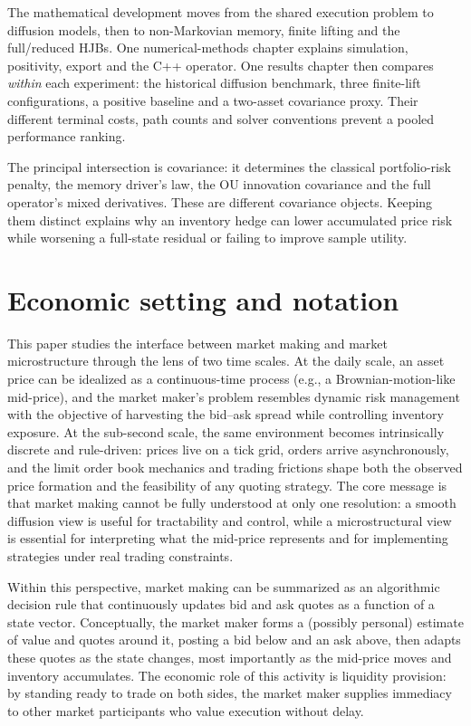 The mathematical development moves from the shared execution problem to diffusion models, then to non-Markovian memory, finite lifting and the full/reduced HJBs. One numerical-methods chapter explains simulation, positivity, export and the C++ operator. One results chapter then compares \emph{within} each experiment: the historical diffusion benchmark, three finite-lift configurations, a positive baseline and a two-asset covariance proxy. Their different terminal costs, path counts and solver conventions prevent a pooled performance ranking.

The principal intersection is covariance: it determines the classical portfolio-risk penalty, the memory driver's law, the OU innovation covariance and the full operator's mixed derivatives. These are different covariance objects. Keeping them distinct explains why an inventory hedge can lower accumulated price risk while worsening a full-state residual or failing to improve sample utility.
\section{Economic setting and notation}

This paper studies the interface between market making and market microstructure through the lens of two time scales. At the daily scale, an asset price can be idealized as a continuous-time process (e.g., a Brownian-motion-like mid-price), and the market maker's problem resembles dynamic risk management with the objective of harvesting the bid--ask spread while controlling inventory exposure. At the sub-second scale, the same environment becomes intrinsically discrete and rule-driven: prices live on a tick grid, orders arrive asynchronously, and the limit order book mechanics and trading frictions shape both the observed price formation and the feasibility of any quoting strategy. The core message is that market making cannot be fully understood at only one resolution: a smooth diffusion view is useful for tractability and control, while a microstructural view is essential for interpreting what the mid-price represents and for implementing strategies under real trading constraints.

Within this perspective, market making can be summarized as an algorithmic decision rule that continuously updates bid and ask quotes as a function of a state vector. Conceptually, the market maker forms a (possibly personal) estimate of value and quotes around it, posting a bid below and an ask above, then adapts these quotes as the state changes, most importantly as the mid-price moves and inventory accumulates. The economic role of this activity is liquidity provision: by standing ready to trade on both sides, the market maker supplies immediacy to other market participants who value execution without delay.

